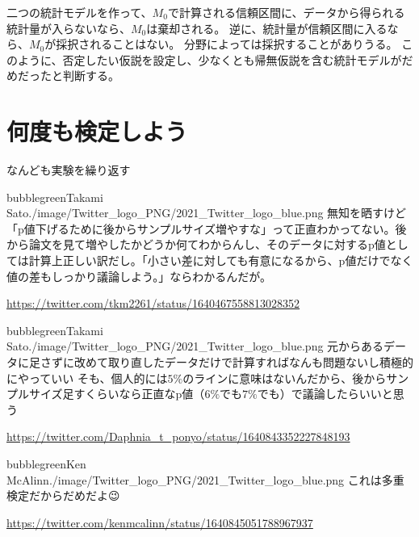 二つの統計モデルを作って、$M_0$で計算される信頼区間に、データから得られる統計量が入らないなら、$M_0$は棄却される。
逆に、統計量が信頼区間に入るなら、$M_0$が採択されることはない。
分野によっては採択することがありうる。
このように、否定したい仮説を設定し、少なくとも帰無仮説を含む統計モデルがだめだったと判断する。





\section{何度も検定しよう}


\begin{SMbox}{なんども実験を繰り返す}
\begin{rightbubbles}{bubblegreen}{Takami Sato}{./image/Twitter_logo_PNG/2021_Twitter_logo_blue.png}
    無知を晒すけど「p値下げるために後からサンプルサイズ増やすな」って正直わかってない。後から論文を見て増やしたかどうか何てわからんし、そのデータに対するp値としては計算上正しい訳だし。「小さい差に対しても有意になるから、p値だけでなく値の差もしっかり議論しよう。」ならわかるんだが。
    \begin{flushright} 
        \small	\url{https://twitter.com/tkm2261/status/1640467558813028352}
        \end{flushright}  
\end{rightbubbles}

\begin{rightbubbles}{bubblegreen}{Takami Sato}{./image/Twitter_logo_PNG/2021_Twitter_logo_blue.png}
    元からあるデータに足さずに改めて取り直したデータだけで計算すればなんも問題ないし積極的にやっていい
    そも、個人的には$5\%$のラインに意味はないんだから、後からサンプルサイズ足すくらいなら正直なp値（$6\%$でも$7\%$でも）で議論したらいいと思う
    \begin{flushright} 
        \small	\url{https://twitter.com/Daphnia_t_ponyo/status/1640843352227848193}
        \end{flushright}  
\end{rightbubbles}

\begin{rightbubbles}{bubblegreen}{Ken McAlinn}{./image/Twitter_logo_PNG/2021_Twitter_logo_blue.png}
    これは多重検定だからだめだよ😉
\begin{flushright} 
\small	\url{https://twitter.com/kenmcalinn/status/1640845051788967937}
\end{flushright}    
\end{rightbubbles}



\end{SMbox}
